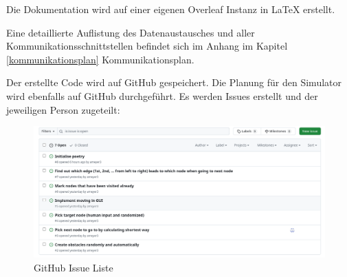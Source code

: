 Die Dokumentation wird auf einer eigenen Overleaf Instanz in LaTeX erstellt.

Eine detaillierte Auflistung des Datenaustausches und aller Kommunikationsschnittstellen befindet sich im Anhang im Kapitel \ref{kommunikationsplan} Kommunikationsplan.

Der erstellte Code wird auf GitHub gespeichert. Die Planung für den Simulator wird ebenfalls auf GitHub durchgeführt. Es werden Issues erstellt und der jeweiligen Person zugeteilt:

\begin{figure}[H]
\centering
\includegraphics[width=\textwidth]{img/github-issues.png}
\caption{GitHub Issue Liste}
\label{fig:github-issues}
\end{figure}
